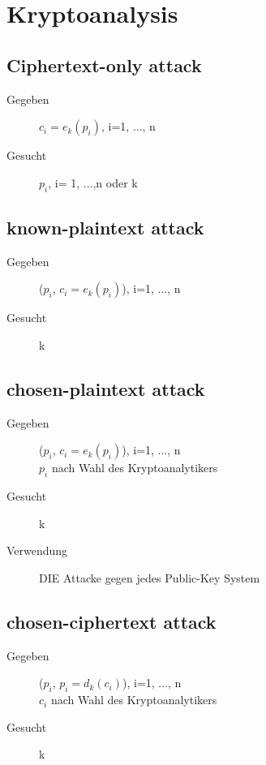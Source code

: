 \documentclass[10pt]{article}
\begin{document}
\newpage
\section{Kryptoanalysis}
\subsection{Ciphertext-only attack}
\begin{description}
	\item[Gegeben] $c_i=e_k(p_i)$, i=1, ..., n
	\item[Gesucht] $p_i$, i= 1, ...,n oder k
\end{description}

\subsection{known-plaintext attack}
\begin{description}
	\item[Gegeben] ($p_i$, $c_i=e_k(p_i)$), i=1, ..., n
	\item[Gesucht] k
\end{description}

\subsection{chosen-plaintext attack}
\begin{description}
	\item[Gegeben] ($p_i$, $c_i=e_k(p_i)$), i=1, ..., n \\
		$p_i$ nach Wahl des Kryptoanalytikers
	\item[Gesucht] k
	\item[Verwendung] DIE Attacke gegen jedes Public-Key System
\end{description}

\subsection{chosen-ciphertext attack}
\begin{description}
	\item[Gegeben] ($p_i$, $p_i=d_k(c_i)$), i=1, ..., n \\
		$c_i$ nach Wahl des Kryptoanalytikers
	\item[Gesucht] k
\end{description}

\end{document}
